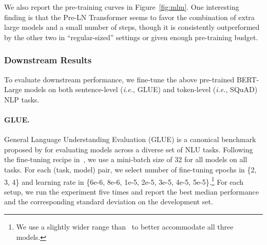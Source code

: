 \documentclass[11pt,a4paper]{article}
\begin{document}
We also report the pre-training curves in Figure~\ref{fig:mlm}. One interesting finding is that the Pre-LN Transformer seems to favor the combination of extra large models and a small number of steps, though it is consistently outperformed by the other two in ``regular-sized'' settings or given enough pre-training budget. 



\subsubsection{Downstream Results}
To evaluate downstream performance, we fine-tune the above pre-trained BERT-Large models on both sentence-level (\emph{i.e.}, GLUE) and token-level (\emph{i.e.}, SQuAD) NLP tasks.





\paragraph{GLUE.}
General Language Understanding Evaluation (GLUE) is a canonical benchmark proposed by \citet{Wang-2018-glue} for evaluating models across a diverse set of NLU tasks. Following the fine-tuning recipe in~\citet{Devlin-2019-bert}, we use a mini-batch size of 32 for all models on all tasks. For each (task, model) pair, we select number of fine-tuning epochs in \{2, 3, 4\} and learning rate in \{6e-6, 8e-6, 1e-5, 2e-5, 3e-5, 4e-5, 5e-5\}.\footnote{We use a slightly wider range than~\citet{Devlin-2019-bert} to better accommodate all three models.} For each setup, we run the experiment five times and report the best median performance and the corresponding standard deviation on the development set.
\end{document}
